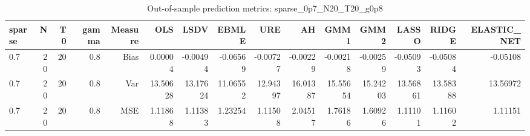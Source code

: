 \begin{table}[!htbp]\centering
\caption{Out-of-sample prediction metrics: sparse_0p7_N20_T20_g0p8}
\label{tab:table3_sparse_0p7_N20_T20_g0p8}
\begin{tabular}{lrrrrrrrrrrrrrr}
\hline
sparse & N & T0 & gamma & Measure & OLS & LSDV & EBMLE & URE & AH & GMM1 & GMM2 & LASSO & RIDGE & ELASTIC_NET \\
\hline
0.7 & 20 & 20 & 0.8 & Bias & 0.00004 & -0.00494 & -0.06569 & -0.00727 & -0.00229 & -0.00218 & -0.00259 & -0.05093 & -0.05084 & -0.05108 \\
0.7 & 20 & 20 & 0.8 & Var & 13.50628 & 13.17624 & 11.06552 & 12.94397 & 16.01387 & 15.55654 & 15.24203 & 13.56861 & 13.58388 & 13.56972 \\
0.7 & 20 & 20 & 0.8 & MSE & 1.11868 & 1.11383 & 1.23254 & 1.11508 & 2.04517 & 1.76186 & 1.60926 & 1.11101 & 1.11602 & 1.11151 \\
\hline
\end{tabular}
\end{table}

